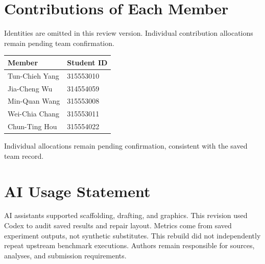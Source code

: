 \section*{Contributions of Each Member}
\ifdefined\JUDGE
Identities are omitted in this review version. Individual contribution allocations remain pending team confirmation.
\else
\begin{center}
\small
\begin{tabular}{ll}
\toprule
Member & Student ID\\
\midrule
Tun-Chieh Yang & 315553010\\
Jia-Cheng Wu & 314554059\\
Min-Quan Wang & 315553008\\
Wei-Chia Chang & 315553011\\
Chun-Ting Hou & 315554022\\
\bottomrule
\end{tabular}
\end{center}
Individual allocations remain pending confirmation, consistent with the saved team record.
\fi

\section*{AI Usage Statement}
AI assistants supported scaffolding, drafting, and graphics. This revision used Codex to audit saved results and repair layout. Metrics come from saved experiment outputs, not synthetic substitutes. This rebuild did not independently repeat upstream benchmark executions. Authors remain responsible for sources, analyses, and submission requirements.
